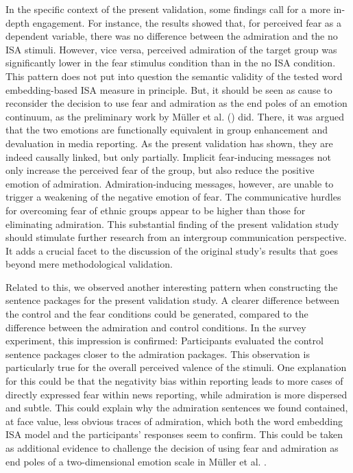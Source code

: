 In the specific context of the present validation, some findings call for a more in-depth engagement. For instance, the results showed that, for perceived fear as a dependent variable, there was no difference between the admiration and the no ISA stimuli. However, vice versa, perceived admiration of the target group was significantly lower in the fear stimulus condition than in the no ISA condition. This pattern does not put into question the semantic validity of the tested word embedding-based ISA measure in principle. But, it should be seen as cause to reconsider the decision to use fear and admiration as the end poles of an emotion continuum, as the preliminary work by Müller et al. (\citeyear{mueller:2023:DRN}) did. There, it was argued that the two emotions are functionally equivalent in group enhancement and devaluation in media reporting. As the present validation has shown, they are indeed causally linked, but only partially. Implicit fear-inducing messages not only increase the perceived fear of the group, but also reduce the positive emotion of admiration. Admiration-inducing messages, however, are unable to trigger a weakening of the negative emotion of fear. The communicative hurdles for overcoming fear of ethnic groups appear to be higher than those for eliminating admiration. This substantial finding of the present validation study should stimulate further research from an intergroup communication perspective. It adds a crucial facet to the discussion of the original study's results that goes beyond mere methodological validation.

Related to this, we observed another interesting pattern when constructing the sentence packages for the present validation study. A clearer difference between the control and the fear conditions could be generated, compared to the difference between the admiration and control conditions. In the survey experiment, this impression is confirmed: Participants evaluated the control sentence packages closer to the admiration packages. This observation is particularly true for the overall perceived valence of the stimuli. One explanation for this could be that the negativity bias within reporting \parencite{soroka:2015:news} leads to more cases of directly expressed fear within news reporting, while admiration is more dispersed and subtle. This could explain why the admiration sentences we found contained, at face value, less obvious traces of admiration, which both the word embedding ISA model and the participants' responses seem to confirm. This could be taken as additional evidence to challenge the decision of using fear and admiration as end poles of a two-dimensional emotion scale in Müller et al. \citeyear{mueller:2023:DRN}.

